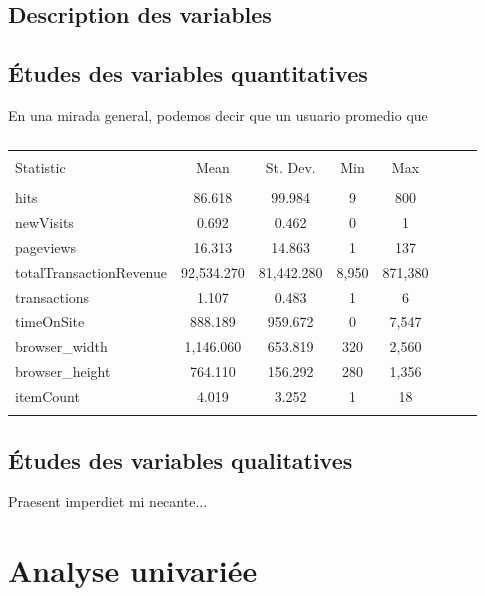 \documentclass[12pt, a4paper]{article}
\begin{document}
\subsection{Description des variables}

\subsection{Études des variables quantitatives}

En una mirada general, podemos decir que un usuario promedio que

\begin{table}[!htbp] \centering 
  \caption{} 
  \label{} 
\begin{tabular}{@{\extracolsep{5pt}}lccccccc} 
\\[-1.8ex]\hline 
\hline \\[-1.8ex] 
Statistic & \multicolumn{1}{c}{Mean} & \multicolumn{1}{c}{St. Dev.} & \multicolumn{1}{c}{Min} & \multicolumn{1}{c}{Max} \\ 
\hline \\[-1.8ex] 
hits & 86.618 & 99.984 & 9 & 800 \\ 
newVisits & 0.692 & 0.462 & 0  & 1 \\ 
pageviews & 16.313 & 14.863 & 1  & 137 \\ 
totalTransactionRevenue & 92,534.270 & 81,442.280 & 8,950  & 871,380 \\ 
transactions & 1.107 & 0.483 & 1 & 6 \\ 
timeOnSite & 888.189 & 959.672 & 0  & 7,547 \\ 
browser\_width & 1,146.060 & 653.819 & 320 & 2,560 \\ 
browser\_height & 764.110 & 156.292 & 280  & 1,356 \\ 
itemCount & 4.019 & 3.252 & 1  & 18 \\ 
\hline \\[-1.8ex] 
\end{tabular} 
\end{table} 


\subsection{Études des variables qualitatives}



Praesent imperdiet mi necante...

\section{Analyse univariée}
\end{document}
